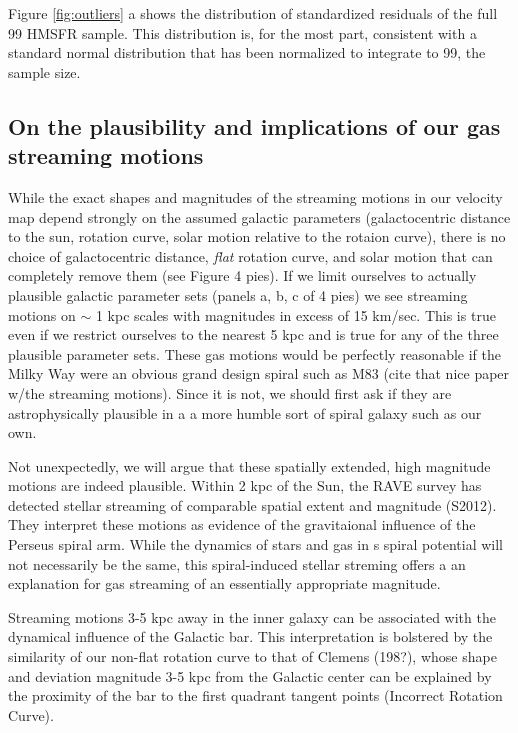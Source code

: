 Figure \ref{fig:outliers} a shows the distribution of standardized residuals of the full 99 HMSFR sample.
This distribution is, for the most part, consistent with a standard normal distribution that has been normalized to integrate to 99, the sample size. 


\subsection{On the plausibility and implications of our gas streaming motions}
While the exact shapes and magnitudes of the streaming motions in our velocity map depend strongly on the assumed galactic parameters (galactocentric distance to the sun, rotation curve, solar motion relative to the rotaion curve), there is no choice of galactocentric distance, \emph{flat} rotation curve, and solar motion that can completely remove them (see Figure 4 pies).
If we limit ourselves to actually plausible galactic parameter sets (panels a, b, c of 4 pies) we see streaming motions on $\sim$ 1 kpc scales with magnitudes in excess of 15 km/sec. 
This is true even if we restrict ourselves to the nearest 5 kpc and is true for any of the three plausible parameter sets. 
These gas motions would be perfectly reasonable if the Milky Way were an obvious grand design spiral such as M83 (cite that nice paper w/the streaming motions). 
Since it is not, we should first ask if they are astrophysically plausible in a a more humble sort of spiral galaxy such as our own. 

Not unexpectedly, we will argue that these spatially extended, high magnitude motions are indeed plausible.
Within 2 kpc of the Sun, the RAVE survey has detected stellar streaming of comparable spatial extent and magnitude (S2012). They interpret these motions as evidence of the gravitaional influence of the Perseus spiral arm.
While the dynamics of stars and gas in s spiral potential will not necessarily be the same, this spiral-induced stellar streming offers a an explanation for gas streaming of an essentially appropriate magnitude.

Streaming motions 3-5 kpc away in the inner galaxy can be associated with the dynamical influence of the Galactic bar. 
This interpretation is bolstered by the similarity of our non-flat rotation curve to that of Clemens (198?), whose shape and deviation magnitude 3-5 kpc from the Galactic center can be explained by the proximity of the bar to the first quadrant tangent points (Incorrect Rotation Curve). 

